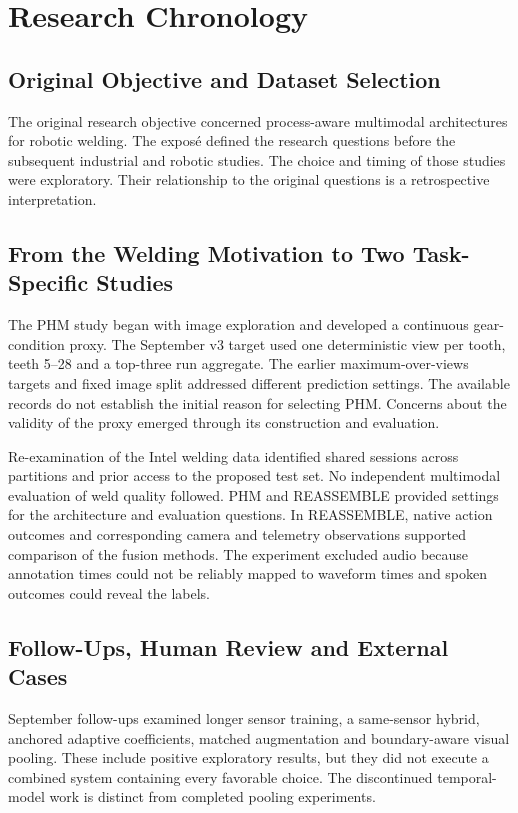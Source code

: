 \chapter{Research Chronology}
\label{app:chronology}
\section{Original Objective and Dataset Selection}
The original research objective concerned process-aware multimodal architectures for robotic welding. The exposé defined the research questions before the subsequent industrial and robotic studies. The choice and timing of those studies were exploratory. Their relationship to the original questions is a retrospective interpretation.

\section{From the Welding Motivation to Two Task-Specific Studies}
The PHM study began with image exploration and developed a continuous gear-condition proxy. The September v3 target used one deterministic view per tooth, teeth 5--28 and a top-three run aggregate. The earlier maximum-over-views targets and fixed image split addressed different prediction settings. The available records do not establish the initial reason for selecting PHM. Concerns about the validity of the proxy emerged through its construction and evaluation.

Re-examination of the Intel welding data identified shared sessions across partitions and prior access to the proposed test set. No independent multimodal evaluation of weld quality followed. PHM and REASSEMBLE provided settings for the architecture and evaluation questions. In REASSEMBLE, native action outcomes and corresponding camera and telemetry observations supported comparison of the fusion methods. The experiment excluded audio because annotation times could not be reliably mapped to waveform times and spoken outcomes could reveal the labels.

\section{Follow-Ups, Human Review and External Cases}
September follow-ups examined longer sensor training, a same-sensor hybrid, anchored adaptive coefficients, matched augmentation and boundary-aware visual pooling. These include positive exploratory results, but they did not execute a combined system containing every favorable choice. The discontinued temporal-model work is distinct from completed pooling experiments.

